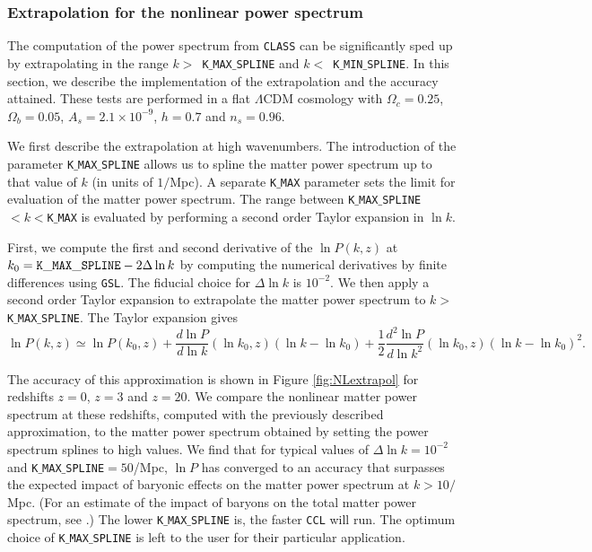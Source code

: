 \documentclass[\docopts]{\docclass}
\newcommand{\ccl}{{\tt CCL}\xspace}
\begin{document}
\subsubsection{Extrapolation for the nonlinear power spectrum}
\label{sec:NLextrapol}

The computation of the power spectrum from {\tt CLASS} can be significantly sped
up by extrapolating in the range $k>$~{\tt K$\_$MAX$\_$SPLINE} and
$k<$~{\tt K$\_$MIN$\_$SPLINE}. In this section, we describe the implementation of the
extrapolation and the accuracy attained. These tests are performed in a flat
$\Lambda$CDM cosmology with $\Omega_c=0.25$, $\Omega_b=0.05$,
$A_s=2.1\times10^{-9}$, $h=0.7$ and $n_s=0.96$.

We first describe the extrapolation at high wavenumbers. The introduction of
the parameter {\tt K$\_$MAX$\_$SPLINE} allows us to spline the matter power
spectrum up to that value of $k$ (in units of $1/$Mpc). A separate {\tt K$\_$MAX}
parameter sets the limit for evaluation of the matter power spectrum. The range
between {\tt K$\_$MAX$\_$SPLINE}$<k<${\tt K$\_$MAX} is evaluated by performing
a second order Taylor expansion in $\ln k$.

First, we compute the first and second derivative of the $\ln P(k,z)$ at
$k_0={\rm \tt K\_MAX\_SPLINE}-2\Delta\ln k$ by computing the numerical
derivatives by finite differences using {\tt GSL}. The fiducial choice for
$\Delta\ln k$ is $10^{-2}$. We then apply a second order Taylor expansion to
extrapolate the matter power spectrum to $k>${\tt K$\_$MAX$\_$SPLINE}.
The Taylor expansion gives
%
\begin{equation}
  \ln P(k,z) \simeq \ln P(k_0,z) + \frac{d\ln P}{d\ln k}(\ln k_0,z) (\ln k-\ln k_0)  + \frac{1}{2}  \frac{d^2\ln P}{d\ln k^2}(\ln k_0,z) (\ln k-\ln k_0)^2.
  \label{eq:NLPSTaylor}
\end{equation}

The accuracy of this approximation is shown in Figure \ref{fig:NLextrapol} for
redshifts $z=0$, $z=3$ and $z=20$. We compare the nonlinear matter power
spectrum at these redshifts, computed with the previously described approximation,
to the matter power spectrum obtained by setting the power spectrum splines to
high values. We find that for typical values of $\Delta \ln k=10^{-2}$ and
{\tt K$\_$MAX$\_$SPLINE}$=50$/Mpc, $\ln P$ has converged to an accuracy that
surpasses the expected impact of baryonic effects on the matter power spectrum
at $k>10/$Mpc. (For an estimate of the impact of baryons on the total matter
power spectrum, see \citealt{Schneider15}.) The lower {\tt K$\_$MAX$\_$SPLINE}
is, the faster \ccl will run. The optimum choice of {\tt K$\_$MAX$\_$SPLINE} is
left to the user for their particular application.
\end{document}
